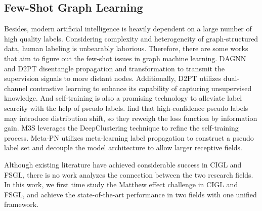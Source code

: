 \subsection{Few-Shot Graph Learning}
Besides, modern artificial intelligence is heavily dependent on a large number of high quality labels. Considering complexity and heterogeneity of graph-structured data, human labeling is unbearably laborious. Therefore, there are some works that aim to figure out the few-shot issues in graph machine learning. DAGNN \cite{liu2020towards} and D2PT \cite{liu2023learning} disentangle propagation and transformation to transmit the supervision signals to more distant nodes. Additionally, D2PT utilizes dual-channel contrastive learning to enhance its capability of capturing unsupervised knowledge. And self-training is also a promising technology to alleviate label scarcity with the help of pseudo labels. \citet{liu2022confidence} find that high-confidence pseudo labels may introduce distribution shift, so they reweigh the loss function by information gain. M3S \cite{sun2020multi} leverages the DeepClustering technique to refine the self-training process. Meta-PN \cite{ding2022meta} utilizes meta-learning label propagation to construct a pseudo label set and decouple the model architecture to allow larger receptive fields.

Although existing literature have achieved considerable success in CIGL and FSGL, there is no work analyzes the connection between the two research fields. In this work, we first time study the Matthew effect challenge in CIGL and FSGL, and achieve the state-of-the-art performance in two fields with one unified framework.

